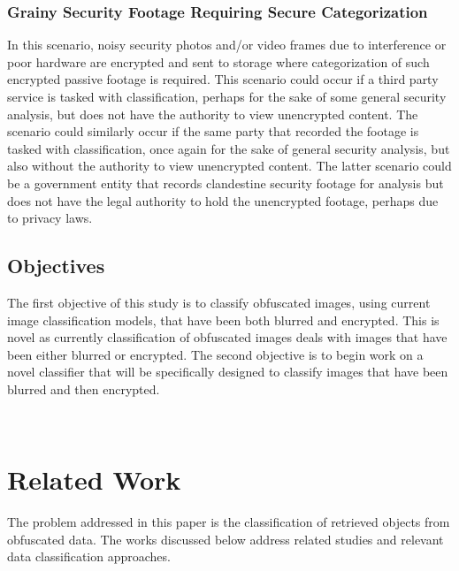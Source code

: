 \documentclass[12pt, titlepage]{article}
\begin{document}
\subsubsection{Grainy Security Footage Requiring Secure Categorization}
In this scenario, noisy security photos and/or video frames due to interference or poor hardware are encrypted and sent to storage where categorization of such encrypted passive footage is required. This scenario could occur if a third party service is tasked with classification, perhaps for the sake of some general security analysis, but does not have the authority to view unencrypted content. The scenario could similarly occur if the same party that recorded the footage is tasked with classification, once again for the sake of general security analysis, but also without the authority to view unencrypted content. The latter scenario could be a government entity that records clandestine security footage for analysis but does not have the legal authority to hold the unencrypted footage, perhaps due to privacy laws. 


\subsection{Objectives}\label{objectives}
The first objective of this study is to classify obfuscated images, using current image classification models, that have been both blurred and encrypted. This is novel as currently classification of obfuscated images deals with images that have been either blurred or encrypted. The second objective is to begin work on a novel classifier that will be specifically designed to classify images that have been blurred and then encrypted.

~\newpage
\section{Related Work}
The problem addressed in this paper is the classification of retrieved objects from obfuscated data. The works discussed below address related studies and relevant data classification approaches.
\end{document}

